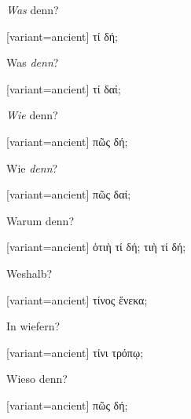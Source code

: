 \emph{Was} denn?

\switchcolumn

\begin{greek}[variant=ancient]%
τί δή;

\end{greek}%
\switchcolumn*

Was \emph{denn}?

\switchcolumn

\begin{greek}[variant=ancient]%
τί δαί;

\end{greek}%
\switchcolumn*

\emph{Wie} denn?

\switchcolumn

\begin{greek}[variant=ancient]%
πῶς δή;

\end{greek}%
\switchcolumn*

Wie \emph{denn}?

\switchcolumn

\begin{greek}[variant=ancient]%
πῶς δαί;

\end{greek}%
\switchcolumn*

Warum denn?

\switchcolumn

\begin{greek}[variant=ancient]%
ὁτιὴ τί δή; τιὴ τί δή;

\end{greek}%
\switchcolumn*

Wes\textcompwordmark{}halb?

\switchcolumn

\begin{greek}[variant=ancient]%
τίνος ἕνεκα;

\end{greek}%
\switchcolumn*

In wiefern?

\switchcolumn

\begin{greek}[variant=ancient]%
τίνι τρόπῳ;

\end{greek}%
\switchcolumn*

Wieso denn?

\switchcolumn

\begin{greek}[variant=ancient]%
πῶς δή;

\end{greek}%
\switchcolumn*

